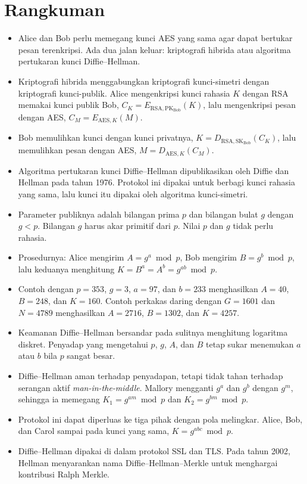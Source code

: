 \section{Rangkuman}
\begin{itemize}
    \item Alice dan Bob perlu memegang kunci AES yang sama agar dapat bertukar
          pesan terenkripsi. Ada dua jalan keluar: kriptografi hibrida atau
          algoritma pertukaran kunci Diffie--Hellman.
    \item Kriptografi hibrida menggabungkan kriptografi kunci-simetri dengan
          kriptografi kunci-publik. Alice mengenkripsi kunci rahasia $K$ dengan
          RSA memakai kunci publik Bob,
          $C_K = E_{\text{RSA},\text{PK}_{\text{Bob}}}(K)$, lalu mengenkripsi
          pesan dengan AES, $C_M = E_{\text{AES},K}(M)$.
    \item Bob memulihkan kunci dengan kunci privatnya,
          $K = D_{\text{RSA},\text{SK}_{\text{Bob}}}(C_K)$, lalu memulihkan pesan
          dengan AES, $M = D_{\text{AES},K}(C_M)$.
    \item Algoritma pertukaran kunci Diffie--Hellman dipublikasikan oleh Diffie
          dan Hellman pada tahun 1976. Protokol ini dipakai untuk berbagi kunci
          rahasia yang sama, lalu kunci itu dipakai oleh algoritma
          kunci-simetri.
    \item Parameter publiknya adalah bilangan prima $p$ dan bilangan bulat $g$
          dengan $g < p$. Bilangan $g$ harus akar primitif dari $p$. Nilai $p$
          dan $g$ tidak perlu rahasia.
    \item Prosedurnya: Alice mengirim $A = g^a \bmod p$, Bob mengirim
          $B = g^b \bmod p$, lalu keduanya menghitung
          $K = B^a = A^b = g^{ab} \bmod p$.
    \item Contoh dengan $p = 353$, $g = 3$, $a = 97$, dan $b = 233$ menghasilkan
          $A = 40$, $B = 248$, dan $K = 160$. Contoh perkakas daring dengan
          $G = 1601$ dan $N = 4789$ menghasilkan $A = 2716$, $B = 1302$, dan
          $K = 4257$.
    \item Keamanan Diffie--Hellman bersandar pada sulitnya menghitung logaritma
          diskret. Penyadap yang mengetahui $p$, $g$, $A$, dan $B$ tetap sukar
          menemukan $a$ atau $b$ bila $p$ sangat besar.
    \item Diffie--Hellman aman terhadap penyadapan, tetapi tidak tahan terhadap
          serangan aktif \textit{man-in-the-middle}. Mallory mengganti $g^a$ dan
          $g^b$ dengan $g^m$, sehingga ia memegang $K_1 = g^{am} \bmod p$ dan
          $K_2 = g^{bm} \bmod p$.
    \item Protokol ini dapat diperluas ke tiga pihak dengan pola melingkar.
          Alice, Bob, dan Carol sampai pada kunci yang sama,
          $K = g^{abc} \bmod p$.
    \item Diffie--Hellman dipakai di dalam protokol SSL dan TLS. Pada tahun
          2002, Hellman menyarankan nama Diffie--Hellman--Merkle untuk menghargai
          kontribusi Ralph Merkle.
\end{itemize}
